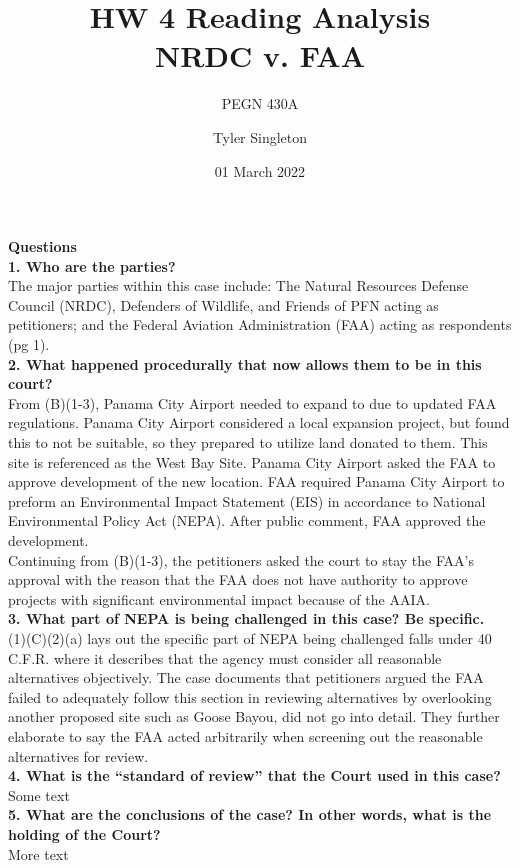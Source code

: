 \documentclass[12pt]{article}
\title{HW 4 Reading Analysis\\
NRDC v. FAA}
\subtitle{PEGN 430A}
\author{Tyler Singleton}
\date{01 March 2022}
\begin{document}
\maketitle

\newpage
\setlength{\parindent}{0pt}

\textbf{Questions} \\

\textbf{1. Who are the parties?} \\

The major parties within this case include: The Natural Resources Defense Council (NRDC), Defenders of Wildlife, and Friends of PFN acting as petitioners; and the Federal Aviation Administration (FAA) acting as respondents (pg 1). 
\\

\textbf{2. What happened procedurally that now allows them to be in this court?} \\

From (B)(1-3), Panama City Airport needed to expand to due to updated FAA regulations. Panama City Airport considered a local expansion project, but found this to not be suitable, so they prepared to utilize land donated to them. This site is referenced as the West Bay Site. Panama City Airport asked the FAA to approve development of the new location. FAA required Panama City Airport to preform an Environmental Impact Statement (EIS) in accordance to National Environmental Policy Act (NEPA). After public comment, FAA approved the development. \\

Continuing from (B)(1-3), the petitioners asked the court to stay the FAA's approval with the reason that the FAA does not have authority to approve projects with significant environmental impact because of the AAIA. \\

\textbf{3. What part of NEPA is being challenged in this case?  Be specific.} \\

\textsection (1)(C)(2)(a) lays out the specific part of NEPA being challenged falls under 40 C.F.R.  where it describes that the agency must consider all reasonable alternatives objectively. The case documents that petitioners argued the FAA failed to adequately follow this section in reviewing alternatives by overlooking another proposed site such as Goose Bayou, did not go into detail. They further elaborate to say the FAA acted arbitrarily when screening out the reasonable alternatives for review. \\

\textbf{4. What is the “standard of review” that the Court used in this case?} \\

Some text \\

\textbf{5. What are the conclusions of the case? In other words, what is the holding of the Court?} \\

More text \\
\end{document}
